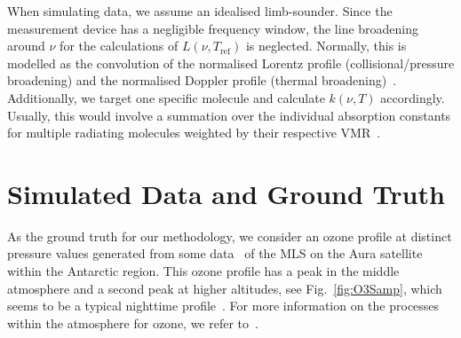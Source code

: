 When simulating data, we assume an idealised limb-sounder.
Since the measurement device has a negligible frequency window, the line broadening around $\nu$ for the calculations of $L(\nu, T_{\text{ref}})$ is neglected.
Normally, this is modelled as the convolution of the normalised Lorentz profile (collisional/pressure broadening) and the normalised Doppler profile (thermal broadening)~\cite{mipas2000handbook}.
Additionally, we target one specific molecule and calculate $k(\nu, T)$ accordingly.
Usually, this would involve a summation over the individual absorption constants for multiple radiating molecules weighted by their respective VMR~\cite{mipas2000handbook}.


\section{Simulated Data and Ground Truth}
\label{sec:SimDat}
As the ground truth for our methodology, we consider an ozone profile at distinct pressure values generated from some data~\cite{MLSdata} of the MLS on the Aura satellite within the Antarctic region.
This ozone profile has a peak in the middle atmosphere and a second peak at higher altitudes, see Fig.~\ref{fig:O3Samp}, which seems to be a typical nighttime profile~\cite{Lee2020NightOzone}.
For more information on the processes within the atmosphere for ozone, we refer to~\cite{Lee2020NightOzone}.

